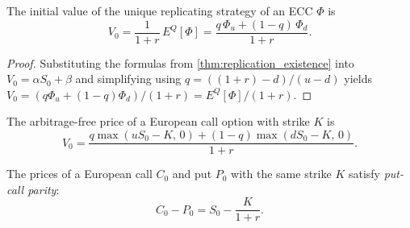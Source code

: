 \begin{theorem}\label{thm:risk_neutral_pricing}
  The initial value of the unique replicating strategy of an ECC $\Phi$ is
  \[
    V_0 = \frac{1}{1 + r}\,E^Q[\Phi] = \frac{q\,\Phi_u + (1-q)\,\Phi_d}{1 + r}.
  \]
\end{theorem}

\begin{proof}
  Substituting the formulas from \ref{thm:replication_existence} into
  $V_0 = \alpha S_0 + \beta$ and simplifying using $q = ((1 + r) - d)/(u - d)$
  yields $V_0 = (q\Phi_u + (1-q)\Phi_d)/(1 + r) = E^Q[\Phi]/(1 + r)$.
\end{proof}

\begin{corollary}\label{cor:call_price}
  The arbitrage-free price of a European call option with strike $K$ is
  \[
    V_0 = \frac{q\max(uS_0-K,\,0) + (1-q)\max(dS_0-K,\,0)}{1 + r}.
  \]
\end{corollary}

\begin{corollary}\label{cor:put_call_parity}
  The prices of a European call $C_0$ and put $P_0$ with the same strike
  $K$ satisfy \emph{put-call parity}:
  \[
    C_0 - P_0 = S_0 - \frac{K}{1 + r}.
  \]
\end{corollary}